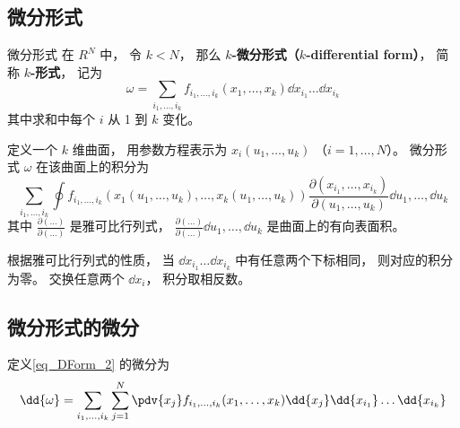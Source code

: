 \subsection{微分形式}
\begin{definition}{微分形式}
在 $R^N$ 中， 令 $k < N$， 那么 \textbf{$k$-微分形式（$k$-differential form）}， 简称 \textbf{$k$-形式}， 记为
\begin{equation}\label{eq_DForm_2}
\omega = \sum_{i_1,\dots,i_k} f_{i_1,\dots,i_k}(x_1,\dots,x_k) \dd{x_{i_1}}\dots\dd{x_{i_k}}
\end{equation}
其中求和中每个 $i$ 从 1 到 $k$ 变化。

定义一个 $k$ 维曲面， 用参数方程表示为 $x_i(u_1,\dots,u_k)$ （$i=1,\dots,N$）。 微分形式 $\omega$ 在该曲面上的积分为
\begin{equation}
\sum_{i_1,\dots,i_k} \oint f_{i_1,\dots,i_k}(x_1(u_1,\dots,u_k),\dots,x_k(u_1,\dots,u_k)) \frac{\partial(x_{i_1},\dots,x_{i_k})}{\partial(u_1,\dots,u_k)} \dd{u_1},\dots,\dd{u_k}
\end{equation}
其中 $\frac{\partial(\dots)}{\partial(\dots)}$ 是雅可比行列式， $\frac{\partial(\dots)}{\partial(\dots)}\dd{u_1},\dots,\dd{u_k}$ 是曲面上的有向表面积。
\end{definition}
根据雅可比行列式的性质， 当 $\dd{x_{i_1}}\dots\dd{x_{i_k}}$ 中有任意两个下标相同， 则对应的积分为零。 交换任意两个 $\dd{x_i}$， 积分取相反数。

\subsection{微分形式的微分}
定义\autoref{eq_DForm_2} 的微分为
\begin{equation}
\dd{\omega} = \sum_{i_1,\dots,i_k}\sum_{j=1}^N \pdv{x_j} f_{i_1,\dots,i_k}(x_1,\dots,x_k) \dd{x_j}\dd{x_{i_1}}\dots\dd{x_{i_k}}
\end{equation}

